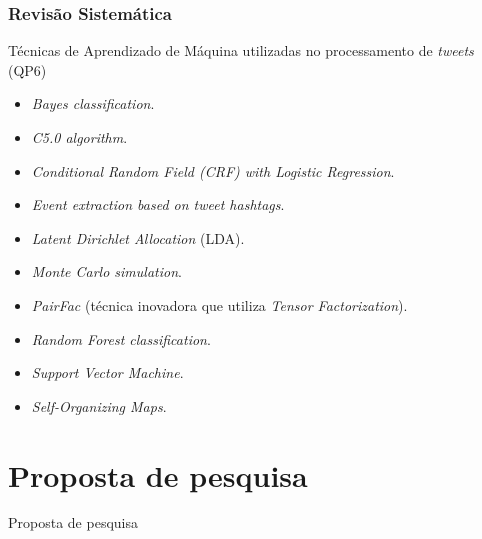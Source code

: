 \documentclass{beamer}
\begin{document}
\begin{frame}
\frametitle{Revisão Sistemática}
\begin{block}{Técnicas de Aprendizado de Máquina utilizadas no processamento de \textit{tweets} (QP6)}
\begin{itemize}
\item \textit{Bayes classification}.
\item \textit{C5.0 algorithm}.
\item \textit{Conditional Random Field (CRF) with Logistic Regression}.
\item \textit{Event extraction based on tweet hashtags}.
\item \textit{Latent Dirichlet Allocation} (LDA).
\item \textit{Monte Carlo simulation}.
\item \textit{PairFac} (técnica inovadora que utiliza \textit{Tensor Factorization}).
\item \textit{Random Forest classification}.
\item \textit{Support Vector Machine}.
\item \textit{Self-Organizing Maps}.
\end{itemize}

\end{block}
\end{frame}
\section{Proposta de pesquisa}
\begin{frame}
\Huge{\centerline{Proposta de pesquisa}}
\end{frame}
\end{document}
